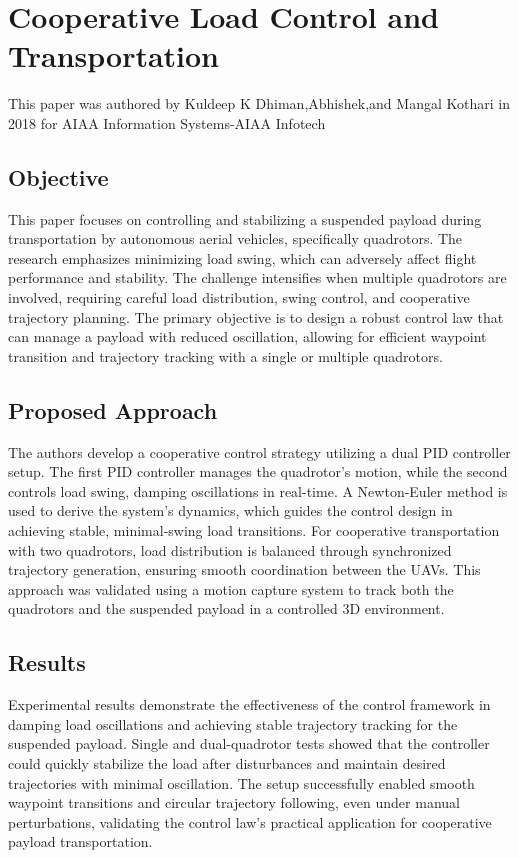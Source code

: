 \documentclass[a4paper,12pt]{article}
\begin{document}
\section{Cooperative Load Control and Transportation}

This paper\cite{dhiman2018cooperative} was authored by Kuldeep K Dhiman,Abhishek,and Mangal Kothari in 2018 for AIAA Information Systems-AIAA Infotech 

\subsection{Objective}
This paper focuses on controlling and stabilizing a suspended payload during transportation by autonomous aerial vehicles, specifically quadrotors. The research emphasizes minimizing load swing, which can adversely affect flight performance and stability. The challenge intensifies when multiple quadrotors are involved, requiring careful load distribution, swing control, and cooperative trajectory planning. The primary objective is to design a robust control law that can manage a payload with reduced oscillation, allowing for efficient waypoint transition and trajectory tracking with a single or multiple quadrotors.

\subsection{Proposed Approach}
The authors develop a cooperative control strategy utilizing a dual PID controller setup. The first PID controller manages the quadrotor's motion, while the second controls load swing, damping oscillations in real-time. A Newton-Euler method is used to derive the system’s dynamics, which guides the control design in achieving stable, minimal-swing load transitions. For cooperative transportation with two quadrotors, load distribution is balanced through synchronized trajectory generation, ensuring smooth coordination between the UAVs. This approach was validated using a motion capture system to track both the quadrotors and the suspended payload in a controlled 3D environment.

\subsection{Results}
Experimental results demonstrate the effectiveness of the control framework in damping load oscillations and achieving stable trajectory tracking for the suspended payload. Single and dual-quadrotor tests showed that the controller could quickly stabilize the load after disturbances and maintain desired trajectories with minimal oscillation. The setup successfully enabled smooth waypoint transitions and circular trajectory following, even under manual perturbations, validating the control law’s practical application for cooperative payload transportation.
\end{document}
